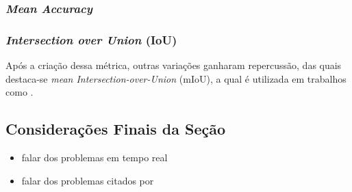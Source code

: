 \subsubsection{\textit{Mean Accuracy}}
\subsubsection{\textit{Intersection over Union} (IoU)}
\label{semantic:IoU}

Após a criação dessa métrica, outras variações ganharam repercussão, das quais destaca-se \textit{mean Intersection-over-Union} (mIoU), a qual é utilizada em trabalhos como \cite{Mohan2020}.


\subsection{Considerações Finais da Seção}
\begin{itemize}
    \item falar dos problemas em tempo real \cite{Yu2018}
    \item falar dos problemas citados por \cite{Kirillov2019a}
\end{itemize}
